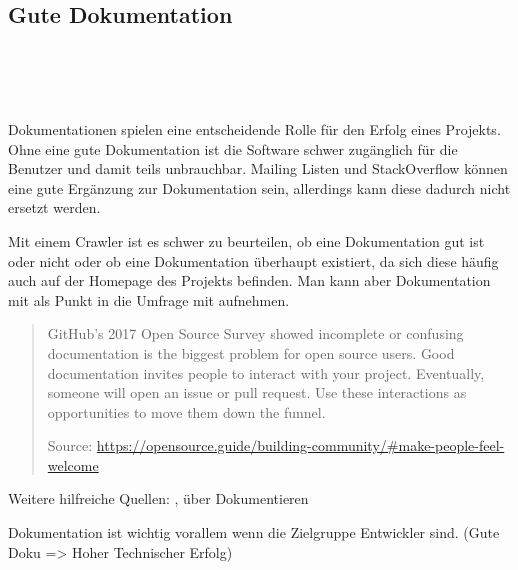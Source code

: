 \subsection{Gute Dokumentation}

 \\
 \\
 \\

Dokumentationen spielen eine entscheidende Rolle für den Erfolg eines Projekts.
Ohne eine gute Dokumentation ist die Software schwer zugänglich für die Benutzer und damit teils
unbrauchbar.
Mailing Listen und StackOverflow können eine gute Ergänzung zur Dokumentation sein, allerdings kann
diese dadurch nicht ersetzt werden.\\ 


Mit einem Crawler ist es schwer zu beurteilen, ob eine Dokumentation gut ist oder nicht oder ob
eine Dokumentation überhaupt existiert, da sich diese häufig auch auf der Homepage des Projekts befinden.
Man kann aber Dokumentation mit als Punkt in die Umfrage mit aufnehmen.

\begin{quote}
    GitHub's 2017 Open Source Survey showed incomplete or confusing documentation is the biggest
    problem for open source users. Good documentation invites people to interact with your project. 
    Eventually, someone will open an issue or pull request. Use these interactions as opportunities 
    to move them down the funnel.

    \tiny
    Source: \url{https://opensource.guide/building-community/#make-people-feel-welcome}
    \normalsize

\end{quote}

Weitere hilfreiche Quellen: ,
 über Dokumentieren

\bigskip


\begin{hypothesis}
    Dokumentation ist wichtig vorallem wenn die Zielgruppe Entwickler sind.
    (Gute Doku => Hoher Technischer Erfolg)
\end{hypothesis}